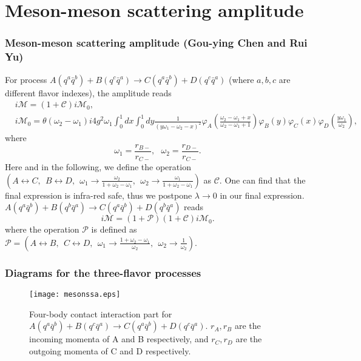 \documentclass[8pt]{beamer}
\begin{document}
\section{Meson-meson scattering amplitude}
\begin{frame}
	\frametitle{Meson-meson scattering amplitude (Gou-ying Chen and Rui Yu)}
	For process $A(q^a\bar q^b)+B(q^c\bar q^a)\rightarrow C(q^a\bar
		q^b)+D(q^c\bar q^a)$ (where $a,b,c$ are different flavor indexes), the amplitude reads
	\begin{align*}
		  & i\mathcal{M} =(1+\mathcal{C})i\mathcal{M}_0,\nonumber          \\
		  & i\mathcal{M}_0 =\theta(\omega_2-\omega_1)i4g^2\omega_1\int_0^1
		dx\int_0^1
		dy\frac{1}{(y\omega_1-\omega_2-x)^2}\varphi_A(\frac{\omega_2-\omega_1+x}{\omega_2-\omega_1+1})\varphi_B(y)
		\varphi_C(x)\varphi_D(\frac{y\omega_1}{\omega_2}),\nonumber
	\end{align*}
	where
	\begin{equation}
		\omega_1=\frac{r_{B-}}{r_{C-}},\ \ \ \omega_2=\frac{r_{D-}}{r_{C-}}.
	\end{equation}
	Here and in the following, we define the operation
	$(A\leftrightarrow C,\ \ B\leftrightarrow D,\ \ \omega_1\rightarrow
		\frac{\omega_2}{1+\omega_2-\omega_1},\ \ \omega_2\rightarrow
		\frac{\omega_1}{1+\omega_2-\omega_1})$ as $\mathcal{C}$. One can
	find that the final expression is infra-red safe, thus we postpone
	$\lambda\rightarrow 0$ in our final expression.
	$A(q^a \bar q^b)+B(q^b\bar
		q^a)\rightarrow C(q^a\bar q^b)+D(q^b\bar q^a) $ reads
	\begin{equation}
		i\mathcal{M}=(1+\mathcal{P})(1+\mathcal{C})i\mathcal{M}_{0}.
	\end{equation}
	where the operation $\mathcal{P}$ is defined as
	$\mathcal{P}=(A\leftrightarrow B,\ \ C\leftrightarrow D,\ \
		\omega_1\rightarrow \frac{1+\omega_2-\omega_1}{\omega_2},\ \
		\omega_2\rightarrow \frac{1}{\omega_2})$.
\end{frame}

\begin{frame}
	\frametitle{Diagrams for the three-flavor processes}
	\begin{figure}[hbt]
		\begin{center}
			\texttt{[image: mesonssa.eps]}\\
			\caption{Four-body contact interaction part for $A(q^a\bar
					q^b)+B(q^c\bar q^a)\rightarrow C(q^a\bar q^b)+D(q^c\bar q^a)$.
				$r_A,r_B$ are the incoming momenta of A and B respectively, and
				$r_C,r_D$ are the outgoing momenta of C and D respectively.
			}\label{mesonscatteringa}
		\end{center}
	\end{figure}

\end{frame}
\end{document}
